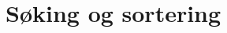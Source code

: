 \documentclass[main.tex]{article}
\begin{document}
    \section{Søking og sortering}
\end{document}

